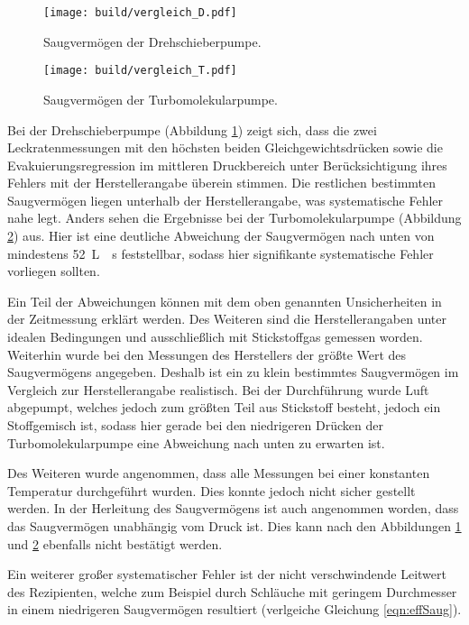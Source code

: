 \begin{figure}
  \centering
  \texttt{[image: build/vergleich\_D.pdf]}
  \caption{Saugvermögen der Drehschieberpumpe.}
  \label{fig:vgl_D}
\end{figure}
\begin{figure}
  \centering
  \texttt{[image: build/vergleich\_T.pdf]}
  \caption{Saugvermögen der Turbomolekularpumpe.}
  \label{fig:vgl_T}
\end{figure}
\FloatBarrier

Bei der Drehschieberpumpe (Abbildung \ref{fig:vgl_D}) zeigt sich,
dass die zwei Leckratenmessungen mit den
höchsten beiden Gleichgewichtsdrücken sowie die Evakuierungsregression im
mittleren Druckbereich unter Berücksichtigung ihres Fehlers mit der Herstellerangabe
überein stimmen. Die restlichen bestimmten Saugvermögen liegen unterhalb der
Herstellerangabe, was systematische Fehler nahe legt.
Anders sehen die Ergebnisse bei der Turbomolekularpumpe
(Abbildung \ref{fig:vgl_T}) aus. Hier ist eine deutliche Abweichung der
Saugvermögen nach unten von mindestens \SI{52}{\liter{}\second}
feststellbar, sodass hier signifikante systematische Fehler vorliegen sollten.

Ein Teil der Abweichungen können mit dem oben genannten Unsicherheiten in
der Zeitmessung erklärt werden. Des Weiteren sind die Herstellerangaben
unter idealen Bedingungen und ausschließlich mit Stickstoffgas gemessen
worden. Weiterhin wurde bei den Messungen des Herstellers der größte
Wert des Saugvermögens angegeben. Deshalb ist ein zu klein bestimmtes
Saugvermögen im Vergleich zur Herstellerangabe realistisch. Bei der
Durchführung wurde Luft abgepumpt, welches jedoch zum größten Teil aus
Stickstoff besteht, jedoch ein Stoffgemisch ist, sodass hier gerade bei
den niedrigeren Drücken der Turbomolekularpumpe eine Abweichung nach unten
zu erwarten ist.

Des Weiteren wurde angenommen, dass alle Messungen bei einer konstanten
Temperatur durchgeführt wurden. Dies konnte jedoch nicht sicher gestellt werden.
In der Herleitung des Saugvermögens ist auch angenommen worden, dass das
Saugvermögen unabhängig vom Druck ist. Dies kann nach den Abbildungen
\ref{fig:vgl_D} und \ref{fig:vgl_T} ebenfalls nicht bestätigt werden.

Ein weiterer großer systematischer Fehler ist der nicht verschwindende Leitwert
des Rezipienten, welche zum Beispiel durch Schläuche mit geringem Durchmesser
in einem niedrigeren Saugvermögen resultiert (verlgeiche Gleichung \eqref{eqn:effSaug}).

